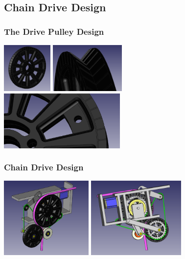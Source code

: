 \documentclass{beamer}
\begin{document}
\subsection{Chain Drive Design}
\begin{frame}
\frametitle{The Drive Pulley Design}
\centering\includegraphics[height=2.5cm]{pull1}
\centering\includegraphics[height=2.5cm]{pull3} \\
\centering\includegraphics[height=2.95cm]{pull2}

\end{frame}
\begin{frame}
\frametitle{Chain Drive Design}
\centering\includegraphics[height=4cm]{final1}
\centering\includegraphics[height=4cm]{final2}
\end{frame}
\end{document}

